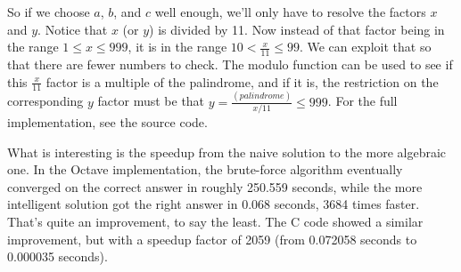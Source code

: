 \documentclass{article}
\begin{document}
So if we choose $a$, $b$, and $c$ well enough, we’ll only have to resolve the factors $x$ and
$y$. Notice that $x$ (or $y$) is divided by 11. Now instead of that factor being in the range 
$1 \leq x \leq 999$, it is in the range $10 < \frac{x}{11} \leq 99$. We can exploit that so 
that there are fewer numbers to check. The modulo function can be used to see if this 
$\frac{x}{11}$ factor is a multiple of the palindrome, and if it is, the restriction on the 
corresponding $y$ factor must be that $y = \frac{(palindrome)}{x/11} \leq 999$. For the full 
implementation, see the source code.

What is interesting is the speedup from the naive solution to the more algebraic one. In the 
Octave implementation, the brute-force algorithm eventually converged on the correct answer 
in roughly 250.559 seconds, while the more intelligent solution got the right answer in 0.068 
seconds, 3684 times faster. That’s quite an improvement, to say the least. The C code showed 
a similar improvement, but with a speedup factor of 2059 (from 0.072058 seconds to 0.000035 
seconds).
\end{document}
